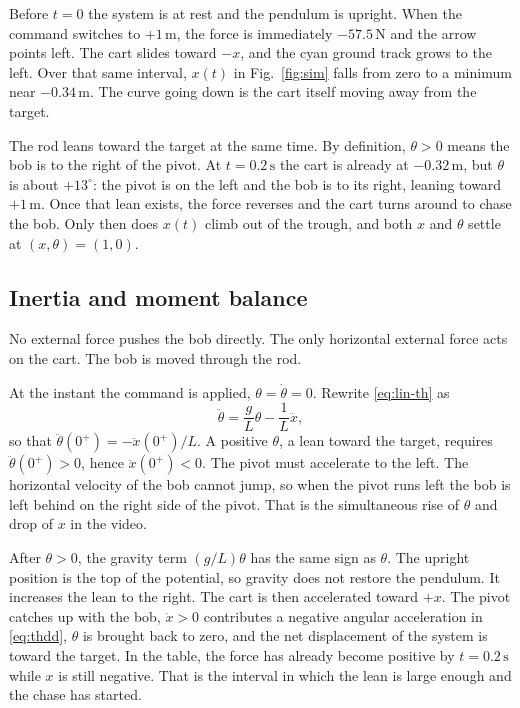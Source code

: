 \documentclass[12pt,a4paper]{article}
\begin{document}
Before \(t=0\) the system is at rest and the pendulum is upright.
When the command switches to \(+1\,\mathrm{m}\), the force is immediately \(-57.5\,\mathrm{N}\) and the arrow points left.
The cart slides toward \(-x\), and the cyan ground track grows to the left.
Over that same interval, \(x(t)\) in Fig.~\ref{fig:sim} falls from zero to a minimum near \(-0.34\,\mathrm{m}\).
The curve going down is the cart itself moving away from the target.

The rod leans toward the target at the same time.
By definition, \(\theta>0\) means the bob is to the right of the pivot.
At \(t=0.2\,\mathrm{s}\) the cart is already at \(-0.32\,\mathrm{m}\), but \(\theta\) is about \(+13^\circ\): the pivot is on the left and the bob is to its right, leaning toward \(+1\,\mathrm{m}\).
Once that lean exists, the force reverses and the cart turns around to chase the bob.
Only then does \(x(t)\) climb out of the trough, and both \(x\) and \(\theta\) settle at \((x,\theta)=(1,0)\).

\subsection{Inertia and moment balance}

No external force pushes the bob directly.
The only horizontal external force acts on the cart. The bob is moved through the rod.

At the instant the command is applied, \(\theta=\dot\theta=0\). Rewrite \eqref{eq:lin-th} as
\begin{equation}
  \ddot\theta=\frac{g}{L}\theta-\frac{1}{L}\ddot x,
  \label{eq:thdd}
\end{equation}
so that \(\ddot\theta(0^+)=-\ddot x(0^+)/L\).
A positive \(\theta\), a lean toward the target, requires \(\ddot\theta(0^+)>0\), hence \(\ddot x(0^+)<0\).
The pivot must accelerate to the left.
The horizontal velocity of the bob cannot jump, so when the pivot runs left the bob is left behind on the right side of the pivot.
That is the simultaneous rise of \(\theta\) and drop of \(x\) in the video.

After \(\theta>0\), the gravity term \((g/L)\theta\) has the same sign as \(\theta\).
The upright position is the top of the potential, so gravity does not restore the pendulum. It increases the lean to the right.
The cart is then accelerated toward \(+x\). The pivot catches up with the bob, \(\ddot x>0\) contributes a negative angular acceleration in \eqref{eq:thdd}, \(\theta\) is brought back to zero, and the net displacement of the system is toward the target.
In the table, the force has already become positive by \(t=0.2\,\mathrm{s}\) while \(x\) is still negative. That is the interval in which the lean is large enough and the chase has started.
\end{document}
